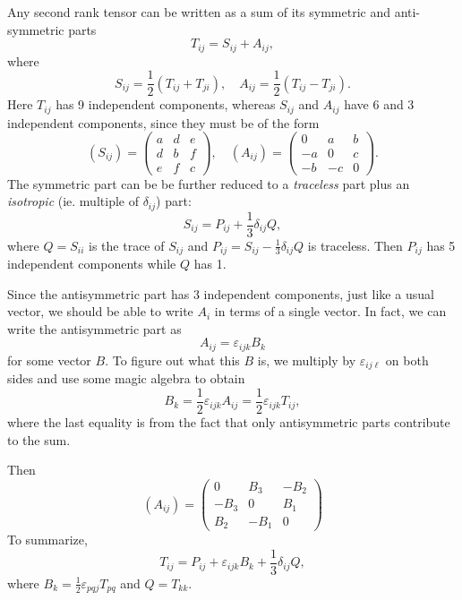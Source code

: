 \documentclass[a4paper]{article}
\begin{document}
Any second rank tensor can be written as a sum of its symmetric and anti-symmetric parts
\[
  T_{ij} = S_{ij} + A_{ij},
\]
where
\[
  S_{ij} = \frac{1}{2}(T_{ij} + T_{ji}),\quad A_{ij} = \frac{1}{2}(T_{ij} - T_{ji}).
\]
Here $T_{ij}$ has 9 independent components, whereas $S_{ij}$ and $A_{ij}$ have 6 and 3 independent components, since they must be of the form
\[
  (S_{ij}) =
  \begin{pmatrix}
    a & d & e\\
    d & b & f\\
    e & f & c
  \end{pmatrix}
  ,\quad
  (A_{ij}) =
  \begin{pmatrix}
    0 & a & b\\
    -a & 0 & c\\
    -b & -c & 0
  \end{pmatrix}.
\]
The symmetric part can be be further reduced to a \emph{traceless} part plus an \emph{isotropic} (ie. multiple of $\delta_{ij}$) part:
\[
  S_{ij} = P_{ij} + \frac{1}{3}\delta_{ij} Q,
\]
where $Q = S_{ii}$ is the trace of $S_{ij}$ and $P_{ij} = S_{ij} -\frac{1}{3}\delta_{ij}Q$ is traceless. Then $P_{ij}$ has 5 independent components while $Q$ has 1.

Since the antisymmetric part has 3 independent components, just like a usual vector, we should be able to write $A_{i}$ in terms of a single vector. In fact, we can write the antisymmetric part as
\[
  A_{ij} = \varepsilon_{ijk}B_k
\]
for some vector $B$. To figure out what this $B$ is, we multiply by $\varepsilon_{ij\ell}$ on both sides and use some magic algebra to obtain
\[
  B_k = \frac{1}{2}\varepsilon_{ijk}A_{ij} = \frac{1}{2}\varepsilon_{ijk}T_{ij},
\]
where the last equality is from the fact that only antisymmetric parts contribute to the sum.

Then
\[
  (A_{ij}) =
  \begin{pmatrix}
    0 & B_3 & -B_2\\
    -B_3 & 0 & B_1\\
    B_2 & -B_1 & 0
  \end{pmatrix}
\]
To summarize,
\[
  T_{ij} = P_{ij} + \varepsilon_{ijk}B_k + \frac{1}{3}\delta_{ij}Q,
\]
where $B_k = \frac{1}{2}\varepsilon_{pqj} T_{pq}$ and $Q = T_{kk}$.
\end{document}
